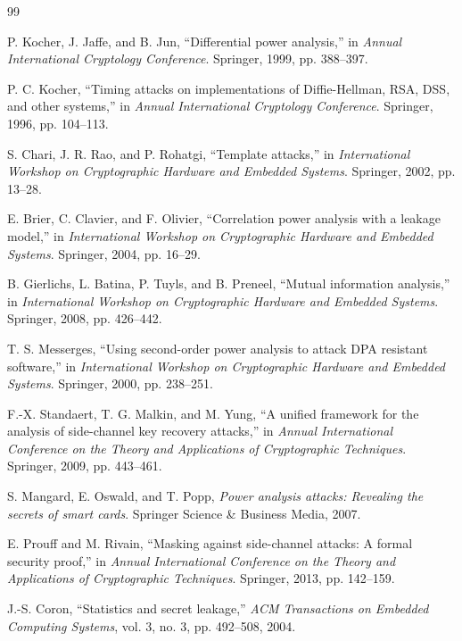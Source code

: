 \documentclass[11pt,a4paper]{article}
\theoremstyle{definition}
\begin{document}
\begin{thebibliography}{99}

P. Kocher, J. Jaffe, and B. Jun, ``Differential power analysis,'' in \textit{Annual International Cryptology Conference}. Springer, 1999, pp. 388--397.

P. C. Kocher, ``Timing attacks on implementations of Diffie-Hellman, RSA, DSS, and other systems,'' in \textit{Annual International Cryptology Conference}. Springer, 1996, pp. 104--113.

S. Chari, J. R. Rao, and P. Rohatgi, ``Template attacks,'' in \textit{International Workshop on Cryptographic Hardware and Embedded Systems}. Springer, 2002, pp. 13--28.

E. Brier, C. Clavier, and F. Olivier, ``Correlation power analysis with a leakage model,'' in \textit{International Workshop on Cryptographic Hardware and Embedded Systems}. Springer, 2004, pp. 16--29.

B. Gierlichs, L. Batina, P. Tuyls, and B. Preneel, ``Mutual information analysis,'' in \textit{International Workshop on Cryptographic Hardware and Embedded Systems}. Springer, 2008, pp. 426--442.

T. S. Messerges, ``Using second-order power analysis to attack DPA resistant software,'' in \textit{International Workshop on Cryptographic Hardware and Embedded Systems}. Springer, 2000, pp. 238--251.

F.-X. Standaert, T. G. Malkin, and M. Yung, ``A unified framework for the analysis of side-channel key recovery attacks,'' in \textit{Annual International Conference on the Theory and Applications of Cryptographic Techniques}. Springer, 2009, pp. 443--461.

S. Mangard, E. Oswald, and T. Popp, \textit{Power analysis attacks: Revealing the secrets of smart cards}. Springer Science \& Business Media, 2007.

E. Prouff and M. Rivain, ``Masking against side-channel attacks: A formal security proof,'' in \textit{Annual International Conference on the Theory and Applications of Cryptographic Techniques}. Springer, 2013, pp. 142--159.

J.-S. Coron, ``Statistics and secret leakage,'' \textit{ACM Transactions on Embedded Computing Systems}, vol. 3, no. 3, pp. 492--508, 2004.

\end{thebibliography}
\end{document}
